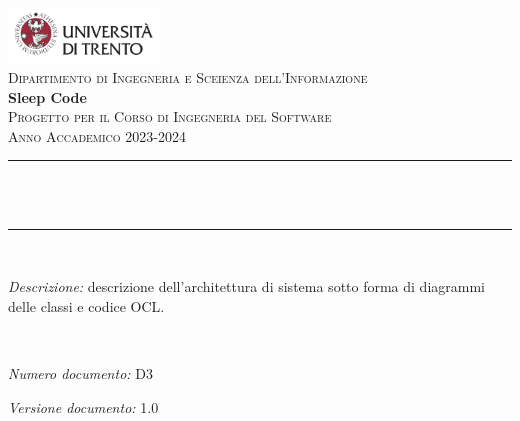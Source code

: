 \begin{titlepage}
    \newcommand{\HRule}{\rule{\linewidth}{0.3mm}} %
    \center %
    
    \includegraphics[width=0.3\textwidth]{materiale/elementi-copertina/UniTrento_logo_ITA_colore.png}\\[0.5cm]
    \textsc{\Large Dipartimento di Ingegneria e Sceienza dell'Informazione}\\[1.5cm]
    
    {\Huge\textbf{Sleep Code}}\\[0.5cm]
    \textsc{\large Progetto per il Corso di Ingegneria del Software}\\
    \textsc{\large Anno Accademico 2023-2024}\\[0.5cm]
    
    
    \HRule\\[0.4cm]
    {\huge\bfseries \@title}\\[0.1cm]
    \HRule\\[1cm]
    
    \begin{minipage}{\textwidth}
    \textit{Descrizione:} descrizione dell'architettura di sistema sotto forma di diagrammi delle classi e codice OCL.
    \end{minipage}\\[1.5cm]
    
    
    \begin{minipage}{0.4\textwidth}
    \begin{flushleft}
    \large
    \textit{Numero documento:} D3
    \end{flushleft}
    \end{minipage}
    \begin{minipage}{0.4\textwidth}
    \begin{flushright}
    \large
    \textit{Versione documento:} 1.0
    \end{flushright}
    \end{minipage}\\[1.5cm]
    

\end{titlepage}
